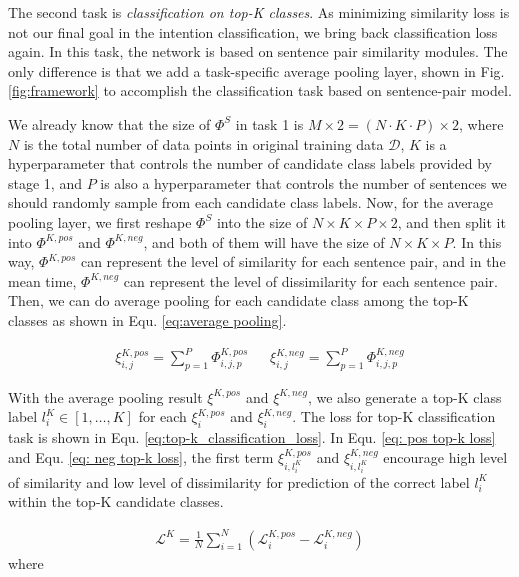 The  second  task  is  \emph{classification  on  top-K classes}. As minimizing
similarity  loss  is  not  our  final goal in the intention classification, we
bring  back  classification  loss again. In this task, the network is based on
sentence  pair  similarity  modules.  The  only  difference  is  that we add a
task-specific  average  pooling  layer,  shown  in Fig. \ref{fig:framework} to
accomplish the classification task based on sentence-pair model.

We  already  know  that the size of ${\Phi}^S$ in task 1 is $M\times 2=(N\cdot
K\cdot  P)\times  2$, where $N$ is the total number of data points in original
training  data $\mathcal{D}$, $K$ is a hyperparameter that controls the number
of   candidate   class  labels  provided  by  stage  1,  and  $P$  is  also  a
hyperparameter that controls the number of sentences we should randomly sample
from each candidate class labels. Now, for the average pooling layer, we first
reshape  ${\Phi}^S$  into  the  size  of $N\times K\times P\times 2$, and then
split  it  into  ${\Phi}^{K,pos}$  and ${\Phi}^{K,neg}$, and both of them will
have  the  size  of  $N\times  K\times  P$.  In this way, ${\Phi}^{K,pos}$ can
represent  the  level  of  similarity  for each sentence pair, and in the mean
time,  ${\Phi}^{K,neg}$  can  represent  the  level  of dissimilarity for each
sentence  pair. Then, we can do average pooling for each candidate class among
the  top-K  classes  as  shown  in  Equ.  \ref{eq:average  pooling}.

\begin{align}
  {\xi}_{i,j}^{K,pos} = \sum_{p=1}^{P}{\varPhi}_{i,j,p}^{K,pos} \ \ \ \ \ \ \ 
  {\xi}_{i,j}^{K,neg} = \sum_{p=1}^{P}{\varPhi}_{i,j,p}^{K,neg}
  \label{eq:average pooling}
\end{align}

With  the  average pooling result ${\xi}^{K,pos}$ and ${\xi}^{K,neg}$, we also
generate   a   top-K   class   label   $l^{K}_i\in   [1,\dots,K]$   for   each
${\xi}^{K,pos}_{i}$ and ${\xi}^{K,neg}_{i}$. The loss for top-K classification
task is shown in Equ. \ref{eq:top-k_classification_loss}. In Equ. \ref{eq: pos
top-k   loss}   and   Equ.   \ref{eq:   neg   top-k   loss},  the  first  term
$\xi_{i,l^{K}_{i}}^{K,pos}$  and  $\xi_{i,l^{K}_{i}}^{K,neg}$  encourage  high
level  of  similarity  and  low  level  of dissimilarity for prediction of the
correct label $l^{K}_i$ within the top-K candidate classes.

\begin{align}
  \mathcal{L}^{K} = \frac{1}{N}\sum_{i=1}^{N}(\mathcal{L}^{K,pos}_{i} - \mathcal{L}^{K,neg}_{i})
  \label{eq:top-k_classification_loss}
\end{align}
where

